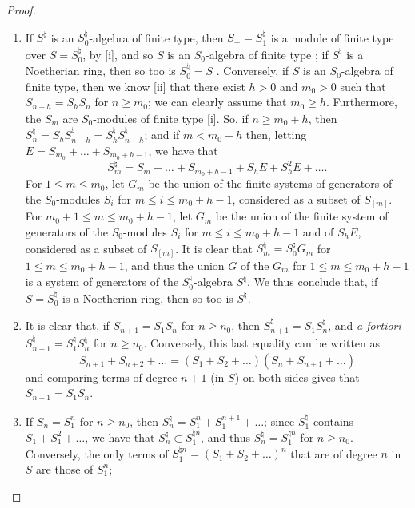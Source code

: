 \begin{proof}
\medskip\noindent
\begin{enumerate}
  \item[\rm{(i)}] If $S^\natural$ is an $S_0^\natural$-algebra of finite type, then $S_+=S_1^\natural$ is a module of finite type over $S=S_0^\natural$, by [i], and so $S$ is an $S_0$-algebra of finite type ;
    if $S^\natural$ is a Noetherian ring, then so too is $S_0^\natural=S$ .
    Conversely, if $S$ is an $S_0$-algebra
    of finite type, then we know [ii] that there exist $h>0$ and $m_0>0$ such that $S_{n+h}=S_hS_n$ for $n\geq m_0$;
    we can clearly assume that $m_0\geq h$.
    Furthermore, the $S_m$ are $S_0$-modules of finite type [i].
    So, if $n\geq m_0+h$, then $S_n^\natural = S_hS_{n-h}^\natural = S_h^\natural S_{n-h}^\natural$;
    and if $m<m_0+h$ then, letting $E = S_{m_0}+\ldots+S_{m_0+h-1}$, we have that
    \[
      S_m^\natural = S_m + \ldots + S_{m_0+h-1} + S_hE + S_h^2E + \ldots.
    \]
    For $1\leq m\leq m_0$, let $G_m$ be the union of the finite systems of generators of the $S_0$-modules $S_i$ for $m\leq i\leq m_0+h-1$, considered as a subset of $S_{[m]}$.
    For $m_0+1\leq m\leq m_0+h-1$, let $G_m$ be the union of the finite system of generators of the $S_0$-modules $S_i$ for $m\leq i\leq m_0+h-1$ and of $S_hE$, considered as a subset of $S_{[m]}$.
    It is clear that $S_m^\natural=S_0^\natural G_m$ for $1\leq m\leq m_0+h-1$, and thus the union $G$ of the $G_m$ for $1\leq m\leq m_0+h-1$ is a system of generators of the $S_0^\natural$-algebra $S^\natural$.
    We thus conclude that, if $S=S_0^\natural$ is a Noetherian ring, then so too is $S^\natural$.
  \item[\rm{(ii)}] It is clear that, if $S_{n+1}=S_1S_n$ for $n\geq n_0$, then $S_{n+1}^\natural=S_1S_n^\natural$, and \emph{a fortiori} $S_{n+1}^\natural=S_1^\natural S_n^\natural$ for $n\geq n_0$.
    Conversely, this last equality can be written as
    \[
      S_{n+1} + S_{n+2} + \ldots
      =
      (S_1 + S_2 + \ldots)(S_n + S_{n+1} + \ldots)
    \]
    and comparing terms of degree $n+1$ (in $S$) on both sides gives that $S_{n+1}=S_1S_n$.
  \item[\rm{(iii)}] If $S_n=S_1^n$ for $n\geq n_0$, then $S_n^\natural=S_1^n+S_1^{n+1}+\ldots$;
    since $S_1^\natural$ contains $S_1+S_1^2+\ldots$, we have that $S_n^\natural\subset S_1^{\natural n}$, and thus $S_n^\natural=S_1^{\natural n}$ for $n\geq n_0$.
    Conversely, the only terms of $S_1^{\natural n}=(S_1+S_2+\ldots)^n$ that are of degree $n$ in $S$ are those of $S_1^n$;

\end{enumerate}
\end{proof}
